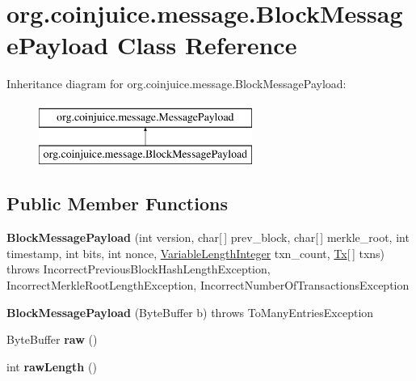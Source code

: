 \hypertarget{classorg_1_1coinjuice_1_1message_1_1_block_message_payload}{\section{org.\-coinjuice.\-message.\-Block\-Message\-Payload Class Reference}
\label{classorg_1_1coinjuice_1_1message_1_1_block_message_payload}
}
Inheritance diagram for org.\-coinjuice.\-message.\-Block\-Message\-Payload\-:\begin{figure}[H]
\begin{center}
\leavevmode
\includegraphics[height=2.000000cm]{classorg_1_1coinjuice_1_1message_1_1_block_message_payload}
\end{center}
\end{figure}
\subsection*{Public Member Functions}
\begin{DoxyCompactItemize}
\item 
\hypertarget{classorg_1_1coinjuice_1_1message_1_1_block_message_payload_aeb8afe12d7ff128e320ccd4c12ee78a6}{{\bfseries Block\-Message\-Payload} (int version, char\mbox{[}$\,$\mbox{]} prev\-\_\-block, char\mbox{[}$\,$\mbox{]} merkle\-\_\-root, int timestamp, int bits, int nonce, \hyperlink{classorg_1_1coinjuice_1_1message_1_1field_1_1_variable_length_integer}{Variable\-Length\-Integer} txn\-\_\-count, \hyperlink{classorg_1_1coinjuice_1_1message_1_1field_1_1_tx}{Tx}\mbox{[}$\,$\mbox{]} txns)  throws Incorrect\-Previous\-Block\-Hash\-Length\-Exception, Incorrect\-Merkle\-Root\-Length\-Exception, Incorrect\-Number\-Of\-Transactions\-Exception }\label{classorg_1_1coinjuice_1_1message_1_1_block_message_payload_aeb8afe12d7ff128e320ccd4c12ee78a6}

\item 
\hypertarget{classorg_1_1coinjuice_1_1message_1_1_block_message_payload_a0f32b212620085761a38a8eacc61a9c9}{{\bfseries Block\-Message\-Payload} (Byte\-Buffer b)  throws To\-Many\-Entries\-Exception }\label{classorg_1_1coinjuice_1_1message_1_1_block_message_payload_a0f32b212620085761a38a8eacc61a9c9}

\item 
\hypertarget{classorg_1_1coinjuice_1_1message_1_1_block_message_payload_a632384fa7eae39316f6e00ed63e32c78}{Byte\-Buffer {\bfseries raw} ()}\label{classorg_1_1coinjuice_1_1message_1_1_block_message_payload_a632384fa7eae39316f6e00ed63e32c78}

\item 
\hypertarget{classorg_1_1coinjuice_1_1message_1_1_block_message_payload_a5cd5702acc4bff431492dfeae829badd}{int {\bfseries raw\-Length} ()}\label{classorg_1_1coinjuice_1_1message_1_1_block_message_payload_a5cd5702acc4bff431492dfeae829badd}

\end{DoxyCompactItemize}


